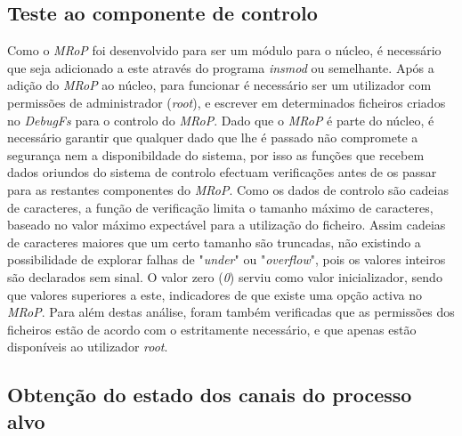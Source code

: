 \subsection{Teste ao componente de controlo}

Como o \textit{MRoP} foi desenvolvido para ser um módulo para o núcleo, é necessário que seja adicionado a este através do programa \textit{insmod} ou semelhante.
Após a adição do \textit{MRoP} ao núcleo, para funcionar é necessário ser um utilizador com permissões de administrador (\textit{root}), e escrever em determinados ficheiros criados no \textit{DebugFs} para o controlo do \textit{MRoP}.
Dado que o \textit{MRoP} é parte do núcleo, é necessário garantir que qualquer dado que lhe é passado não compromete a segurança nem a disponibildade do sistema, por isso as funções que recebem dados oriundos do sistema de controlo efectuam verificações antes de os passar para as restantes componentes do \textit{MRoP}.
Como os dados de controlo são cadeias de caracteres, a função de verificação limita o tamanho máximo de caracteres, baseado no valor máximo expectável para a utilização do ficheiro.
Assim cadeias de caracteres maiores que um certo tamanho são truncadas, não existindo a possibilidade de explorar falhas de "\textit{under}" ou "\textit{overflow}", pois os valores inteiros são declarados sem sinal.
O valor zero (\textit{0}) serviu como valor inicializador, sendo que valores superiores a este, indicadores de que existe uma opção activa no \textit{MRoP}.
Para além destas análise, foram também verificadas que as permissões dos ficheiros estão de acordo com o estritamente necessário, e que apenas estão disponíveis ao utilizador \textit{root}.

\subsection{Obtenção do estado dos canais do processo alvo}

